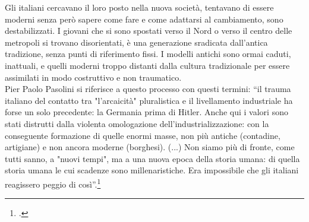 Gli italiani cercavano il loro posto nella nuova società, tentavano di essere moderni senza però sapere come fare e come adattarsi al cambiamento, sono destabilizzati.
I giovani che si sono spostati verso il Nord o verso il centro delle metropoli si trovano disorientati,  è una generazione sradicata dall'antica tradizione, senza punti di riferimento fissi.
I modelli antichi sono ormai caduti, inattuali, e quelli moderni troppo distanti dalla cultura tradizionale per essere assimilati in modo costruttivo e non traumatico.
\\Pier Paolo Pasolini si riferisce a questo processo con questi termini: \enquote{il trauma italiano del contatto tra "l'arcaicità" pluralistica e il livellamento industriale ha forse un solo precedente: la Germania prima di Hitler. Anche qui i valori sono stati distrutti dalla violenta omologazione dell'industrializzazione: con la conseguente formazione di quelle enormi masse, non più antiche (contadine, artigiane) e non ancora moderne (borghesi). (...) Non siamo più di fronte, come tutti sanno, a "nuovi tempi", ma a una nuova epoca della storia umana: di quella storia umana le cui scadenze sono millenaristiche. Era impossibile che gli italiani reagissero peggio di così}.\footcite{Scritti7} 

